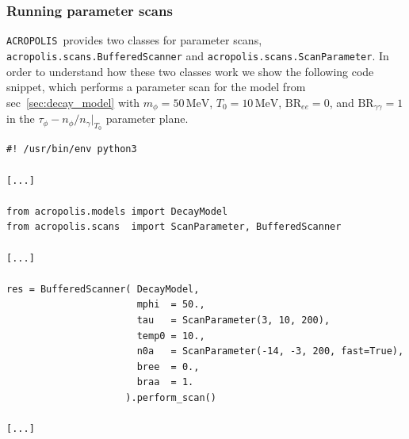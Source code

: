 \documentclass[11pt,a4paper]{article}
\newcommand{\acropolis}{\texttt{ACROPOLIS}~}
\begin{document}
\subsubsection{Running parameter scans}
\label{sec:scans}
\acropolis provides two classes for parameter scans, \texttt{acropolis.scans.BufferedScanner} and \texttt{acropolis.scans.ScanParameter}. In order to understand how these two classes work we show the following code snippet, which performs a parameter scan for the model from sec~\ref{sec:decay_model} with $m_\phi=50\,\mathrm{MeV}$, $T_0 = 10\,\mathrm{MeV}$, $\text{BR}_{ee} = 0$, and $\text{BR}_{\gamma\gamma}=1$ in the $\tau_\phi - n_\phi/n_\gamma|_{T_0}$ parameter plane.
\begin{lstlisting}
#! /usr/bin/env python3

[...]

from acropolis.models import DecayModel
from acropolis.scans  import ScanParameter, BufferedScanner

[...]

res = BufferedScanner( DecayModel,
                       mphi  = 50.,
                       tau   = ScanParameter(3, 10, 200),
                       temp0 = 10.,
                       n0a   = ScanParameter(-14, -3, 200, fast=True),
                       bree  = 0.,
                       braa  = 1.
                     ).perform_scan()

[...]
\end{lstlisting}
\end{document}
